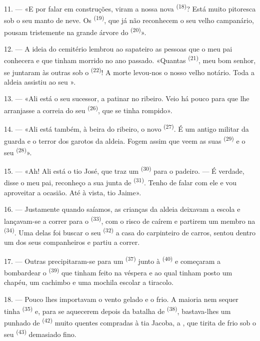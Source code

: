 11. --- «E por falar em construções, viram a nossa nova 
\textsuperscript{(18)}? Está muito pitoresca sob o seu manto de neve. Os
 \textsuperscript{(19)}, que já não reconhecem o seu velho
campanário, pousam tristemente na grande árvore do 
\textsuperscript{(20)}».

12. --- A ideia do cemitério lembrou ao sapateiro as pessoas que o meu
pai conhecera e que tinham morrido no ano passado. «Quantas
 \textsuperscript{(21)}, meu bom senhor, se juntaram às outras sob
o  \textsuperscript{(22)}! A morte levou-nos o nosso velho
notário. Toda a aldeia assistiu ao seu ».

13. --- «Ali está o seu sucessor, a patinar no ribeiro. Veio há pouco
para que lhe arranjasse a correia do seu  \textsuperscript{(26)},
que se tinha rompido».

14. --- «Ali está também, à beira do ribeiro, o novo 
\textsuperscript{(27)}. É um antigo militar da guarda e o terror dos garotos da
aldeia. Fogem assim que veem as suas  \textsuperscript{(29)} e o
seu  \textsuperscript{(28)}».

15. --- «Ah! Ali está o tio José, que traz um  \textsuperscript{(30)} para o padeiro. --- É verdade, disse o meu pai,
reconheço a sua junta de  \textsuperscript{(31)}. Tenho de falar com
ele e vou aproveitar a ocasião. Até à vista, tio Jaime».

16. --- Justamente quando saíamos, as crianças da aldeia deixavam a
escola e lançavam-se a correr para o  \textsuperscript{(33)},
com o risco de caírem e partirem um membro na 
\textsuperscript{(34)}. Uma delas foi buscar o seu 
\textsuperscript{(32)} a casa do carpinteiro de carros, sentou dentro um dos seus
companheiros e partiu a correr.

17. --- Outras precipitaram-se para um 
\textsuperscript{(37)} junto à  \textsuperscript{(40)} e começaram a
bombardear o  \textsuperscript{(39)} que tinham feito na
véspera e ao qual tinham posto um chapéu, um cachimbo e uma mochila
escolar a tiracolo.

18. --- Pouco lhes importavam o vento gelado e o frio. A maioria nem
sequer tinha  \textsuperscript{(35)} e, para se aquecerem depois
da batalha de  \textsuperscript{(38)}, bastava-lhes um
punhado de  \textsuperscript{(42)} muito quentes compradas à tia
Jacoba, a , que tirita de frio sob o seu 
\textsuperscript{(43)} demasiado fino.

